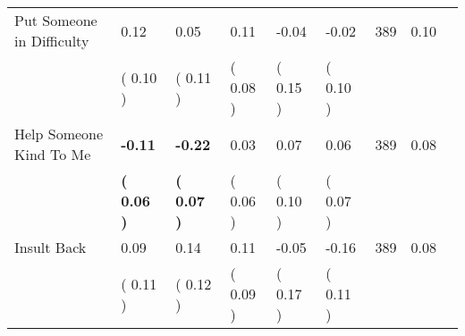\begin{tabular}{L{6.2cm} C{1.8cm} C{1.8cm} C{1.8cm} C{1.8cm} C{1.8cm} C{1.8cm} C{0.3cm} C{0.3cm}}
Put Someone in Difficulty &      0.12 &      0.05 &      0.11 &     -0.04 &     -0.02  & 389 &       0.10 \\ 
 & (     0.10 ) & (     0.11 ) & (     0.08 ) & (     0.15 ) & (     0.10 )  & \\
Help Someone Kind To Me & \textbf{    -0.11} & \textbf{    -0.22} &      0.03 &      0.07 &      0.06  & 389 &       0.08 \\ 
 & \textbf{(     0.06 )} & \textbf{(     0.07 )} & (     0.06 ) & (     0.10 ) & (     0.07 )  & \\
Insult Back &      0.09 &      0.14 &      0.11 &     -0.05 &     -0.16  & 389 &       0.08 \\ 
 & (     0.11 ) & (     0.12 ) & (     0.09 ) & (     0.17 ) & (     0.11 )  & \\
\bottomrule
\end{tabular}
